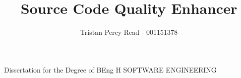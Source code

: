 \documentclass{COMPXXXX} %
\begin{document}

\title{Source Code Quality Enhancer} %
\author{Tristan Percy Read - 001151378} %

\maketitle %
{
	\centering
	Dissertation for the Degree of BEng H SOFTWARE ENGINEERING

} %


% 
\end{document}
